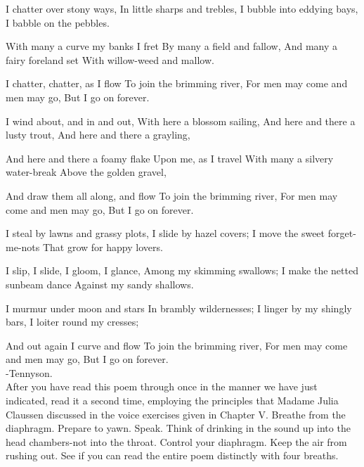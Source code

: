 \documentclass[10pt]{article}
\begin{document}
I chatter over stony ways, In little sharps and trebles, I bubble into eddying bays, I babble on the pebbles.

With many a curve my banks I fret By many a field and fallow, And many a fairy foreland set With willow-weed and mallow.

I chatter, chatter, as I flow To join the brimming river, For men may come and men may go, But I go on forever.

I wind about, and in and out, With here a blossom sailing, And here and there a lusty trout, And here and there a grayling,

And here and there a foamy flake Upon me, as I travel With many a silvery water-break Above the golden gravel,

And draw them all along, and flow To join the brimming river, For men may come and men may go, But I go on forever.

I steal by lawns and grassy plots, I slide by hazel covers; I move the sweet forget-me-nots That grow for happy lovers.

I slip, I slide, I gloom, I glance, Among my skimming swallows; I make the netted sunbeam dance Against my sandy shallows.

I murmur under moon and stars In brambly wildernesses; I linger by my shingly bars, I loiter round my cresses;

And out again I curve and flow To join the brimming river, For men may come and men may go, But I go on forever.\\
-Tennyson.\\
After you have read this poem through once in the manner we have just indicated, read it a second time, employing the principles that Madame Julia Claussen discussed in the voice exercises given in Chapter V. Breathe from the diaphragm. Prepare to yawn. Speak. Think of drinking in the sound up into the head chambers-not into the throat. Control your diaphragm. Keep the air from rushing out. See if you can read the entire poem distinctly with four breaths.
\end{document}
